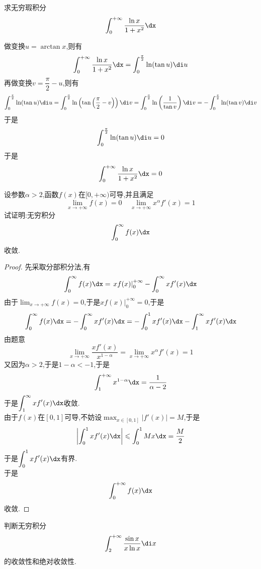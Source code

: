 \documentclass{ctexart}
\begin{document}
\pagestyle{empty}
\begin{center}
    \large{}
\end{center}
\begin{problem}[L.12.1]
    求无穷瑕积分
    \[\int_0^{+\infty}\dfrac{\ln x}{1+x^2}\dx\]

\end{problem}
\begin{solution}
    做变换$u=\arctan x$,则有
    \[\int_0^{+\infty}\dfrac{\ln x}{1+x^2}\dx=\int_0^{\frac\pi2}\ln(\tan u)\di u\]
    再做变换$v=\dfrac\pi2-u$,则有
    \[\int_0^{\frac\pi2}\ln(\tan u)\di u
    =\int_0^{\frac\pi2}\ln\left(\tan\left(\dfrac\pi2-v\right)\right)\di v
    =\int_0^{\frac\pi2}\ln\left(\dfrac{1}{\tan v}\right)\di v
    =-\int_0^{\frac\pi2}\ln(\tan v)\di v\]
    于是
    \[\int_0^{\frac\pi2}\ln(\tan u)\di u=0\]
    于是
    \[\int_0^{+\infty}\dfrac{\ln x}{1+x^2}\dx=0\]

\end{solution}
\begin{problem}[L.12.2]
    设参数$\alpha>2$,函数$f(x)$在$[0,+\infty)$可导,并且满足
    \[\lim_{x\to+\infty}f(x)=0\ \ \ \ \ \lim_{x\to+\infty}x^\alpha f'(x)=1\]
    试证明:无穷积分
    \[\int_0^\infty f(x)\dx\]
    收敛.
\end{problem}
\begin{proof}
    先采取分部积分法,有
    \[\int_0^\infty f(x)\dx
    =\left.xf(x)\right|_0^{+\infty}-\int_0^\infty xf'(x)\dx\]
    由于$\displaystyle\lim_{x\to+\infty}f(x)=0$,于是$\left.xf(x)\right|_0^{+\infty}=0$,于是
    \[\int_0^\infty f(x)\dx=-\int_0^\infty xf'(x)\dx
    =-\int_0^1 xf'(x)\dx-\int_1^\infty xf'(x)\dx\]
    由题意
    \[\lim_{x\to+\infty}\dfrac{xf'(x)}{x^{1-\alpha}}
    =\lim_{x\to+\infty}x^\alpha f'(x)=1\]
    又因为$\alpha>2$,于是$1-\alpha<-1$,于是
    \[\int_1^{+\infty}x^{1-\alpha}\dx=\dfrac{1}{\alpha-2}\]
    于是$\displaystyle\int_1^\infty xf'(x)\dx$收敛.\\
    由于$f(x)$在$[0,1]$可导,不妨设$\displaystyle\max_{x\in[0,1]}\left|f'(x)\right|=M$,于是
    \[\left|\int_0^1 xf'(x)\dx\right|\leqslant\int_0^1Mx\dx=\dfrac M2\]
    于是$\displaystyle\int_0^1 xf'(x)\dx$有界.\\
    于是
    \[\int_0^{+\infty}f(x)\dx\]
    收敛.
\end{proof}
\begin{problem}[L.12.3]
    判断无穷积分
    \[\int_2^{+\infty}\dfrac{\sin x}{x\ln x}\di x\]
    的收敛性和绝对收敛性.
\end{problem}
\end{document}
